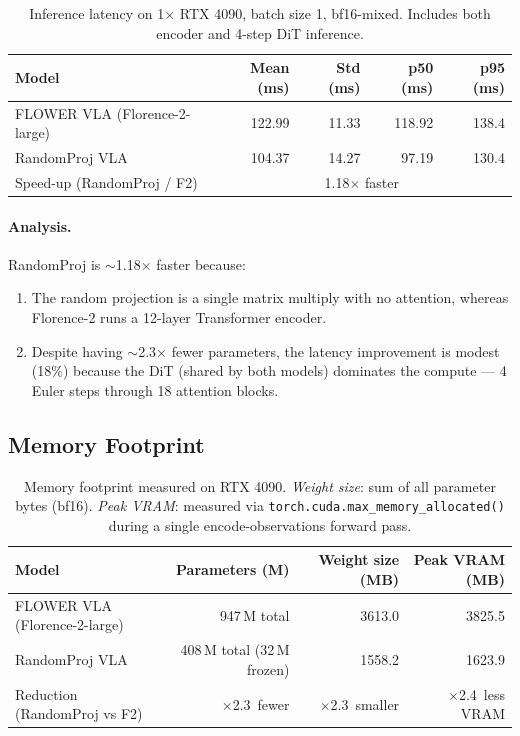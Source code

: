 \documentclass[11pt,a4paper]{article}
\begin{document}
\begin{table}[h]
\centering
{}
\begin{tabular}{lrrrr}
\toprule
\textbf{Model} & \textbf{Mean (ms)} & \textbf{Std (ms)} & \textbf{p50 (ms)} & \textbf{p95 (ms)} \\
\midrule
FLOWER VLA (Florence-2-large) & 122.99 & 11.33 & 118.92 & 138.4 \\
RandomProj VLA                & 104.37 & 14.27 & 97.19 & 130.4 \\
\midrule
Speed-up (RandomProj / F2)    & \multicolumn{4}{c}{1.18$\times$ faster} \\
\bottomrule
\end{tabular}
\caption{Inference latency on 1$\times$ RTX 4090, batch size 1, bf16-mixed.
  Includes both encoder and 4-step DiT inference.}
\label{tab:latency}
\end{table}

\paragraph{Analysis.}
RandomProj is $\sim$1.18$\times$ faster because:
\begin{enumerate}
  \item The random projection is a single matrix multiply with no attention,
        whereas Florence-2 runs a 12-layer Transformer encoder.
  \item Despite having $\sim$2.3$\times$ fewer parameters, the latency
        improvement is modest (18\%) because the DiT (shared by both models)
        dominates the compute — 4 Euler steps through 18 attention blocks.
\end{enumerate}

\subsection{Memory Footprint}
\label{sec:memory}

\begin{table}[h]
\centering
{}
\begin{tabular}{lrrr}
\toprule
\textbf{Model} & \textbf{Parameters (M)} & \textbf{Weight size (MB)} & \textbf{Peak VRAM (MB)} \\
\midrule
FLOWER VLA (Florence-2-large)
  & 947\,M total
  & 3613.0
  & 3825.5 \\
RandomProj VLA
  & 408\,M total (32\,M frozen)
  & 1558.2
  & 1623.9 \\
\midrule
Reduction (RandomProj vs F2)
  & $\times$2.3\ fewer
  & $\times$2.3\ smaller
  & $\times$2.4\ less VRAM \\
\bottomrule
\end{tabular}
\caption{Memory footprint measured on RTX 4090.
  \emph{Weight size}: sum of all parameter bytes (bf16).
  \emph{Peak VRAM}: measured via \texttt{torch.cuda.max\_memory\_allocated()}
  during a single encode-observations forward pass.}
\label{tab:memory}
\end{table}
\end{document}
